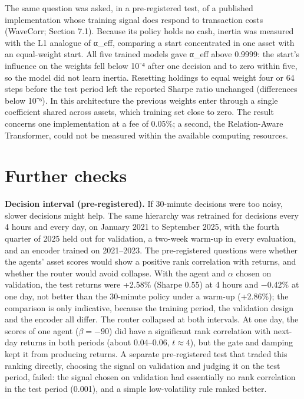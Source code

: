 \documentclass[12pt,a4paper]{report}
\begin{document}
The same question was asked, in a pre-registered test, of a published
implementation whose training signal does respond to transaction costs
(WaveCorr; Section 7.1). Because its policy holds no cash, inertia was
measured with the L1 analogue of α\_eff, comparing a start concentrated
in one asset with an equal-weight start. All five trained models gave
α\_eff above 0.9999: the start's influence on the weights fell below
10⁻⁴ after one decision and to zero within five, so the model did not
learn inertia. Resetting holdings to equal weight four or 64 steps
before the test period left the reported Sharpe ratio unchanged
(differences below 10⁻⁶). In this architecture the previous weights
enter through a single coefficient shared across assets, which training
set close to zero. The result concerns one implementation at a fee of
0.05\%; a second, the Relation-Aware Transformer, could not be measured
within the available computing resources.

\section{Further checks}\label{further-checks}

\textbf{Decision interval (pre-registered).} If 30-minute decisions were
too noisy, slower decisions might help. The same hierarchy was retrained
for decisions every 4 hours and every day, on January 2021 to September
2025, with the fourth quarter of 2025 held out for validation, a
two-week warm-up in every evaluation, and an encoder trained on
2021--2023. The pre-registered questions were whether the agents' asset
scores would show a positive rank correlation with returns, and whether
the router would avoid collapse. With the agent and \(\alpha\) chosen on
validation, the test returns were +2.58\% (Sharpe 0.55) at 4 hours and
−0.42\% at one day, not better than the 30-minute policy under a warm-up
(+2.86\%); the comparison is only indicative, because the training
period, the validation design and the encoder all differ. The router
collapsed at both intervals. At one day, the scores of one agent
(\(\beta=-90\)) did have a significant rank correlation with next-day
returns in both periods (about 0.04--0.06, \(t \approx 4\)), but the
gate and damping kept it from producing returns. A separate
pre-registered test that traded this ranking directly, choosing the
signal on validation and judging it on the test period, failed: the
signal chosen on validation had essentially no rank correlation in the
test period (0.001), and a simple low-volatility rule ranked better.
\end{document}
